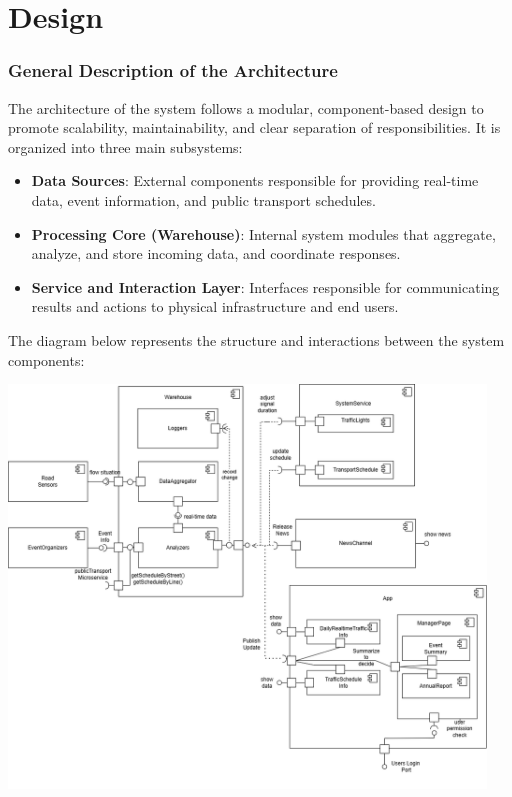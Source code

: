 \chapter{Design}

\subsection{General Description of the Architecture}

The architecture of the system follows a modular, component-based design to promote scalability, maintainability, and clear separation of responsibilities. It is organized into three main subsystems:

\begin{itemize}
    \item \textbf{Data Sources}: External components responsible for providing real-time data, event information, and public transport schedules.
    \item \textbf{Processing Core (Warehouse)}: Internal system modules that aggregate, analyze, and store incoming data, and coordinate responses.
    \item \textbf{Service and Interaction Layer}: Interfaces responsible for communicating results and actions to physical infrastructure and end users.
\end{itemize}

\vspace{1em}
The diagram below represents the structure and interactions between the system components:

\begin{center}
    \includegraphics[width=0.95\textwidth]{Images/ComponentDiagram.png}
\end{center}

